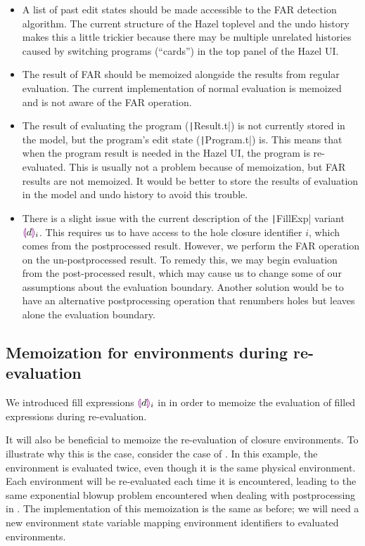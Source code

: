 \begin{itemize}
\item A list of past edit states should be made accessible to the FAR detection algorithm. The current structure of the Hazel toplevel and the undo history makes this a little trickier because there may be multiple unrelated histories caused by switching programs (``cards'') in the top panel of the Hazel UI.
\item The result of FAR should be memoized alongside the results from regular evaluation. The current implementation of normal evaluation is memoized and is not aware of the FAR operation.
\item The result of evaluating the program (\texttt|Result.t|) is not currently stored in the model, but the program's edit state (\texttt|Program.t|) is. This means that when the program result is needed in the Hazel UI, the program is re-evaluated. This is usually not a problem because of memoization, but FAR results are not memoized. It would be better to store the results of evaluation in the model and undo history to avoid this trouble.
\item There is a slight issue with the current description of the \texttt|FillExp| variant $\textcolor{violet}{\llparenthesis} d\textcolor{violet}{\rrparenthesis}_i$. This requires us to have access to the hole closure identifier $i$, which comes from the postprocessed result. However, we perform the FAR operation on the un-postprocessed result. To remedy this, we may begin evaluation from the post-processed result, which may cause us to change some of our assumptions about the evaluation boundary. Another solution would be to have an alternative postprocessing operation that renumbers holes but leaves alone the evaluation boundary.
\end{itemize}

\subsection{Memoization for environments during re-evaluation}
\label{sec:far-improv-memo-envs}

We introduced fill expressions $\textcolor{violet}{\llparenthesis} d\textcolor{violet}{\rrparenthesis}_i$ in  in order to memoize the evaluation of filled expressions during re-evaluation.

It will also be beneficial to memoize the re-evaluation of closure environments. To illustrate why this is the case, consider the case of . In this example, the environment is evaluated twice, even though it is the same physical environment. Each environment will be re-evaluated each time it is encountered, leading to the same exponential blowup problem encountered when dealing with postprocessing in . The implementation of this memoization is the same as before; we will need a new environment state variable mapping environment identifiers to evaluated environments.

